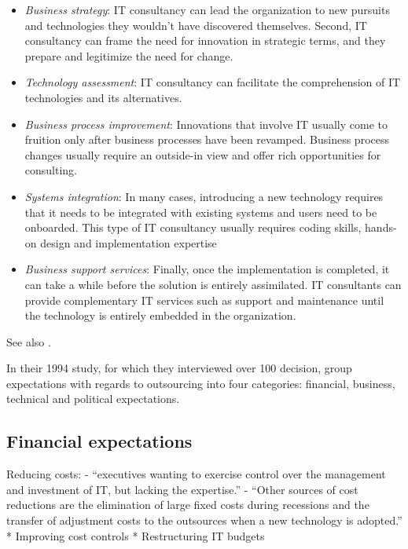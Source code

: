 \documentclass[12pt]{article}
\providecommand{\tightlist}{%
  \setlength{\itemsep}{0pt}\setlength{\parskip}{0pt}}
\begin{document}
\begin{itemize}
\tightlist
\item
  \emph{Business strategy}: IT consultancy can lead the organization to
  new pursuits and technologies they wouldn't have discovered
  themselves. Second, IT consultancy can frame the need for innovation
  in strategic terms, and they prepare and legitimize the need for
  change.
\item
  \emph{Technology assessment}: IT consultancy can facilitate the
  comprehension of IT technologies and its alternatives.
\item
  \emph{Business process improvement}: Innovations that involve IT
  usually come to fruition only after business processes have been
  revamped. Business process changes usually require an outside-in view
  and offer rich opportunities for consulting.
\item
  \emph{Systems integration}: In many cases, introducing a new
  technology requires that it needs to be integrated with existing
  systems and users need to be onboarded. This type of IT consultancy
  usually requires coding skills, hands-on design and implementation
  expertise
\item
  \emph{Business support services}: Finally, once the implementation is
  completed, it can take a while before the solution is entirely
  assimilated. IT consultants can provide complementary IT services such
  as support and maintenance until the technology is entirely embedded
  in the organization.
\end{itemize}

See also \citep{bessant1995}.

In their 1994 study, for which they interviewed over 100 decision,
\citet[10-17]{lacity1994} group expectations with regards to outsourcing
into four categories: financial, business, technical and political
expectations.

\hypertarget{financial-expectations}{%
\subsection{Financial expectations}\label{financial-expectations}}

Reducing costs: - ``executives wanting to exercise control over the
management and investment of IT, but lacking the expertise.'' \citep[
233]{sturdy1998} - ``Other sources of cost reductions are the
elimination of large fixed costs during recessions and the transfer of
adjustment costs to the outsources when a new technology is adopted.''
\citep{aubert1996} * Improving cost controls * Restructuring IT budgets
\end{document}

